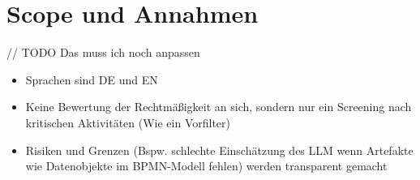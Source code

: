 \section{Scope und Annahmen}\label{sec:scope-und-annahmen}

// TODO Das muss ich noch anpassen

\begin{itemize}
    \item Sprachen sind DE und EN
    \item Keine Bewertung der Rechtmäßigkeit an sich, sondern nur ein Screening nach kritischen Aktivitäten (Wie ein Vorfilter)
    \item Risiken und Grenzen (Bspw. schlechte Einschätzung des LLM wenn Artefakte wie Datenobjekte im BPMN-Modell fehlen) werden transparent gemacht
\end{itemize}